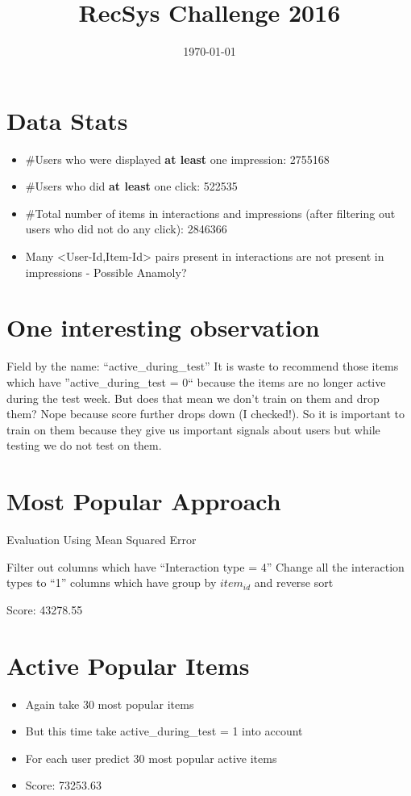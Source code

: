 \documentclass{article}
\begin{document}
\title{RecSys Challenge 2016}
\date{\today}
\maketitle
\section{Data Stats}
\begin{itemize}
 \item \#Users who were displayed \textbf{at least} one impression: 2755168
 \item \#Users who did \textbf{at least} one click: 522535
 \item \#Total number of items in interactions and impressions (after filtering out users who did not do any click): 2846366
 \item 	Many <User-Id,Item-Id> pairs present in interactions are not present in impressions - Possible Anamoly?
\end{itemize}

\section{One interesting observation}
Field by the name: ``active\_during\_test''
It is waste to recommend those items which have ''active\_during\_test = 0`` because the items are no longer active during the test week. But does that mean we don't train on them and drop 
them? Nope because score further drops down (I checked!). So it is important to train on them because they give us important signals about users but while testing we do not test on them.
\section{Most Popular Approach}

\begin{algorithm}
\caption{Evaluation Using Mean Squared Error}
\begin{algorithmic}[1] 
\State Filter out columns which have ``Interaction type = 4''
\State Change all the interaction types to ``1'' columns which have
\State group by $item_{id}$ and reverse sort
\end{algorithmic}
\end{algorithm}
Score: 43278.55

\section{Active Popular Items}
\begin{itemize}
 \item Again take 30 most popular items
 \item But this time take active\_during\_test = 1 into account
 \item For each user predict 30 most popular active items
 \item Score: 73253.63 	
\end{itemize}
\end{document}

